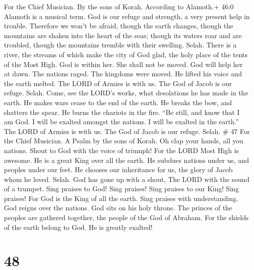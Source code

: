 For the Chief Musician. By the sons of Korah. According to Alamoth.+
46:0 Alamoth is a musical term.  God is our refuge and
strength, a very present help in trouble.  Therefore we
won't be afraid, though the earth changes, though the mountains are
shaken into the heart of the seas;  though its waters roar
and are troubled, though the mountains tremble with their swelling.
Selah.  There is a river, the streams of which make the city
of God glad, the holy place of the tents of the Most High. 
God is within her. She shall not be moved. God will help her at dawn.
 The nations raged. The kingdoms were moved. He lifted his
voice and the earth melted.  The LORD of Armies is with us.
The God of Jacob is our refuge. Selah.  Come, see the LORD's
works, what desolations he has made in the earth.  He makes
wars cease to the end of the earth. He breaks the bow, and shatters the
spear. He burns the chariots in the fire.  ``Be still, and
know that I am God. I will be exalted amongst the nations. I will be
exalted in the earth.''  The LORD of Armies is with us. The
God of Jacob is our refuge. Selah. \# 47 For the Chief Musician. A Psalm
by the sons of Korah.  Oh clap your hands, all you nations.
Shout to God with the voice of triumph!  For the LORD Most
High is awesome. He is a great King over all the earth.  He
subdues nations under us, and peoples under our feet.  He
chooses our inheritance for us, the glory of Jacob whom he loved. Selah.
 God has gone up with a shout, The LORD with the sound of a
trumpet.  Sing praises to God! Sing praises! Sing praises to
our King! Sing praises!  For God is the King of all the
earth. Sing praises with understanding.  God reigns over the
nations. God sits on his holy throne.  The princes of the
peoples are gathered together, the people of the God of Abraham. For the
shields of the earth belong to God. He is greatly exalted!

\hypertarget{section-46}{%
\section{48}\label{section-46}}

